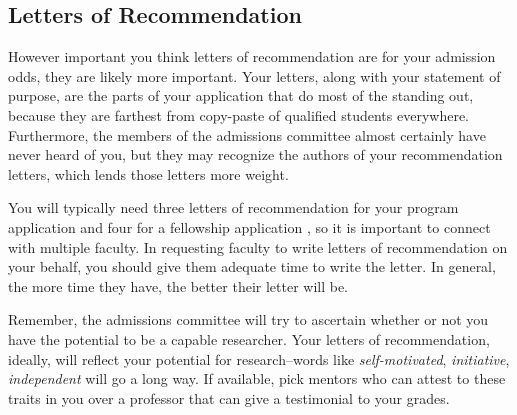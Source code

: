 \documentclass[11pt]{article}
\begin{document}
\subsection{Letters of Recommendation}
However important you think letters of recommendation are for your admission odds, they are likely more important. Your letters, along with your statement of purpose, are the parts of your application that do most of the standing out, because they are farthest from copy-paste of qualified students everywhere. Furthermore, the members of the admissions committee almost certainly have never heard of you, but they may recognize the authors of your recommendation letters, which lends those letters more weight.

You will typically need three letters of recommendation for your program application and four for a fellowship application , so it is important to connect with multiple faculty. In requesting faculty to write letters of recommendation on your behalf, you should give them adequate time to write the letter. In general, the more time they have, the better their letter will be.

Remember, the admissions committee will try to ascertain whether or not you have the potential to be a capable researcher. Your letters of recommendation, ideally, will reflect your potential for research--words like \textit{self-motivated}, \textit{initiative}, \textit{independent} will go a long way. If available, pick mentors who can attest to these traits in you over a professor that can give a testimonial to your grades.
\end{document}
